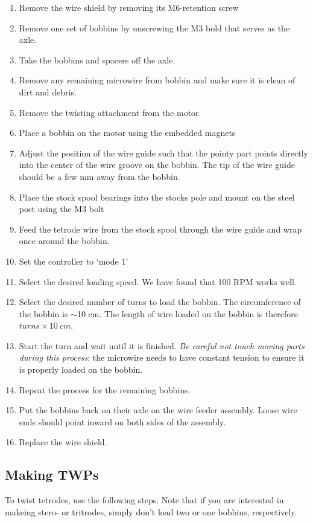 \documentclass[11pt,a4paper]{article}
\begin{document}
\begin{enumerate}[noitemsep]
    \item Remove the wire shield by removing its M6-retention screw
    \item Remove one set of bobbins by unscrewing the M3 bold that serves as
        the axle.
    \item Take the bobbins and spacers off the axle.
    \item Remove any remaining microwire from bobbin and make sure it is clean
        of dirt and debris.
    \item Remove the twisting attachment from the motor.
    \item Place a bobbin on the motor using the embedded magnets
    \item Adjust the position of the wire guide such that the pointy part
        points directly into the center of the wire groove on the bobbin. The
        tip of the wire guide should be a few mm away from the bobbin.
    \item Place the stock spool bearings into the stocks pole and mount on the
        steel post using the M3 bolt
    \item Feed the tetrode wire from the stock spool through the wire guide and
        wrap once around the bobbin.
    \item Set the controller to `mode 1'
    \item Select the desired loading speed. We have found that 100 RPM works
        well.
    \item Select the desired number of turns to load the bobbin. The
        circumference of the bobbin is $\sim$10 cm. The length of wire loaded
        on the bobbin is therefore $turns \times 10\ cm$.
    \item Start the turn and wait until it is finished. \textit{Be careful not
        touch moving parts during this process}: the microwire needs to have
        constant tension to ensure it is properly loaded on the bobbin.
    \item Repeat the process for the remaining bobbins.
    \item Put the bobbins back on their axle on the wire feeder assembly. Loose
        wire ends should point inward on both sides of the assembly.
    \item Replace the wire shield.
\end{enumerate}


\subsection{Making TWPs}
To twist tetrodes, use the following steps. Note that if you are interested in
makeing stero- or tritrodes, simply don't load two or one bobbins, respectively.
\end{document}
